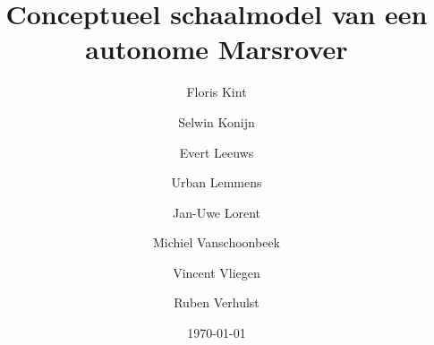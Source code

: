 \documentclass[a4paper,10pt]{article}
\title{Conceptueel schaalmodel van een autonome Marsrover}
\author{Floris Kint \and Selwin Konijn \and Evert Leeuws \and Urban Lemmens \and Jan-Uwe Lorent \and Michiel Vanschoonbeek \and Vincent Vliegen \and Ruben Verhulst}
\date{\today}
\begin{document}
\maketitle
\newpage

\newpage










{}
\end{document}
